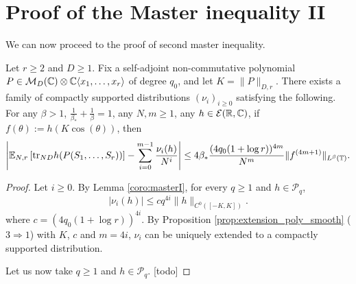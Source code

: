 \section{Proof of the Master inequality II}

We can now proceed to the proof of second master inequality.

\begin{theorem}
  \label{thm:masterII}
  Let $r \geq 2$ and $D \geq 1$.
  Fix a self-adjoint non-commutative polynomial $P \in \nonco$
  of degree $q_0$, and let $K = \|P\|_{D,r}$.
  There exists a family of compactly supported distributions $(\nu_i)_{i\geq 0}$
  satisfying the following.
  For any $\beta > 1$, $\frac{1}{\beta_*} + \frac{1}{\beta} = 1$,
  any $N,m \geq 1$, any $h \in \smooth$, if $f(\theta) := h(K\cos(\theta))$, then
  \begin{equation*}
    \left|\expec\left[\trN[ND] h(P(S_1, \ldots, S_r))\right]
     - \sum_{i=0}^{m-1} \frac{\nu_i(h)}{N^i}\right|
     \leq 4 \beta_* \frac{(4 q_0(1+\log r))^{4m}}{N^m} \|f^{(4m+1)}\|_{L^\beta(\tor)}.
  \end{equation*}
\end{theorem}

\begin{proof}
  Let $i \geq 0$.
  By Lemma \ref{coro:masterI},
  for every $q \geq 1$ and $h \in \mathcal{P}_q$,
  \begin{equation*}
    |\nu_i(h)|
    \leq c q^{4i} \|h\|_{C^0([-K,K])}.
  \end{equation*}
  where $c = (4 q_0(1+\log r))^{4i}$.
  By Proposition \ref{prop:extension_poly_smooth} ($3 \Rightarrow 1$)
  with $K$, $c$ and $m=4i$, $\nu_i$ can be uniquely extended to a compactly supported
  distribution.

  Let us now take $q \geq 1$ and $h \in \mathcal{P}_q$. [todo]
\end{proof}
